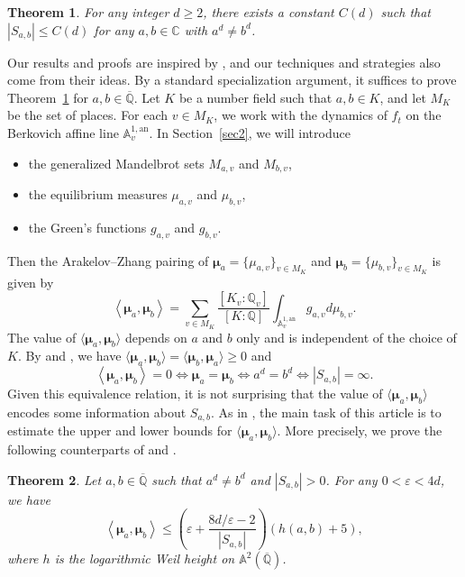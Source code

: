 \documentclass[10pt,a4paper]{amsart}
\numberwithin{equation}{section}
\theoremstyle{plain}
\newtheorem{thm}{Theorem}[section]
\theoremstyle{definition}
\theoremstyle{remark}
\newcommand{\A}{\mathbb A}
\newcommand{\C}{\mathbb C}
\newcommand{\Q}{\mathbb Q}
\newcommand{\an}{\mathrm{an}}
\renewcommand{\bar}{\overline}
\begin{document}
\begin{thm}\label{thm1.1}
For any integer $d\geq2$, there exists a constant
$C(d)$ such that $|S_{a,b}|\leq C(d)$ for any $a,b\in\C$
with $a^{d}\neq b^{d}$.
\end{thm}

Our results and proofs are inspired by \cite{DKY2}, and our techniques
and strategies also come from their ideas. By a standard specialization
argument, it suffices to prove Theorem~\ref{thm1.1} for $a,b\in\bar{\Q}$.
Let $K$ be a number field such that $a,b\in K$, and let $M_{K}$
be the set of places. For each $v\in M_{K}$, we work with the dynamics
of $f_{t}$ on the Berkovich affine line $\A_{v}^{1,\an}$.
In Section~\ref{sec2}, we will introduce
\begin{itemize}
\item the generalized Mandelbrot sets $M_{a,v}$ and $M_{b,v}$,
\item the equilibrium measures $\mu_{a,v}$ and $\mu_{b,v}$,
\item the Green's functions $g_{a,v}$ and $g_{b,v}$.
\end{itemize}
Then the Arakelov--Zhang pairing of $\boldsymbol{\mu}_{a}=\{\mu_{a,v}\}_{v\in M_{K}}$
and $\boldsymbol{\mu}_{b}=\{\mu_{b,v}\}_{v\in M_{K}}$ is given by
\[
\left\langle \boldsymbol{\mu}_{a},\boldsymbol{\mu}_{b}\right\rangle =\sum_{v\in M_{K}}\frac{[K_{v}:\Q_{v}]}{[K:\Q]}\int_{\A_{v}^{1,\an}}g_{a,v}d\mu_{b,v}.
\]
The value of $\langle \boldsymbol{\mu}_{a},\boldsymbol{\mu}_{b}\rangle $
depends on $a$ and $b$ only and is independent of the choice of
$K$. By \cite[Propositions 2.6 and 4.5]{FRL} and \cite[Theorems 1.1 and 3.4]{BD1}, we have 
$\langle \boldsymbol{\mu}_{a},\boldsymbol{\mu}_{b}\rangle =\langle \boldsymbol{\mu}_{b},\boldsymbol{\mu}_{a}\rangle \geq0$
and
\[
\left\langle \boldsymbol{\mu}_{a},\boldsymbol{\mu}_{b}\right\rangle =0\Longleftrightarrow\boldsymbol{\mu}_{a}=\boldsymbol{\mu}_{b}\Longleftrightarrow a^{d}=b^{d}\Longleftrightarrow|S_{a,b}|=\infty.
\]
Given this equivalence relation, it is not surprising that the value
of $\langle \boldsymbol{\mu}_{a},\boldsymbol{\mu}_{b}\rangle $
encodes some information about $S_{a,b}$. As in \cite{DKY1, DKY2}, the main task of this article is to estimate the upper
and lower bounds for $\langle \boldsymbol{\mu}_{a},\boldsymbol{\mu}_{b}\rangle $.
More precisely, we prove the following counterparts of \cite[Theorems 1.5, 1.6, and~1.7]{DKY1}
and \cite[Theorems 1.6, 1.7, and 1.9]{DKY2}.

\begin{thm}\label{thm1.2}
Let $a,b\in\bar{\Q}$ such that $a^{d}\neq b^{d}$
and $|S_{a,b}|>0$. For any $0<\varepsilon<4d$, we have
\[
\left\langle \boldsymbol{\mu}_{a},\boldsymbol{\mu}_{b}\right\rangle \leq\left(\varepsilon+\frac{8d/\varepsilon-2}{|S_{a,b}|}\right)(h(a,b)+5),
\]
where $h$ is the logarithmic Weil height on $\A^{2}(\bar{\Q})$.
\end{thm}
\end{document}
